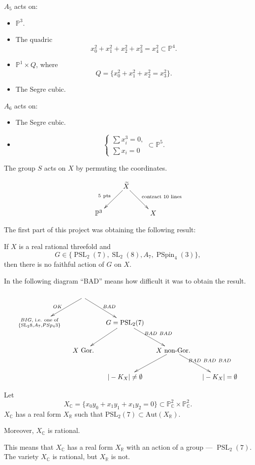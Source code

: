\medskip\noindent
$A_5$ acts on:
\begin{itemize}
\item $\mathbb{P}^3$.
\item The quadric
$$
x_0^2+x_1^2+x_2^2+x_3^2=x_4^2
\subset \mathbb{P}^4.
$$
\item $\mathbb{P}^1\times Q$,
where
$$
Q=
\{x_0^2+x_1^2+x_2^2=x_3^2\}.
$$
\item The Segre cubic.
\end{itemize}

\medskip\noindent
$A_6$ acts on:
\begin{itemize}
\item The Segre cubic.
\item
$$
\begin{cases}
\sum x_i^3=0,\\
\sum x_i=0
\end{cases}
\subset \mathbb{P}^5.
$$
\end{itemize}

The group $S$ acts on $X$ by
permuting the coordinates.

$$
\xymatrix{
&& \widetilde{X}
\ar[dl]_{5\ \text{pts}}
\ar[dr]^{\text{contract $10$ lines}}\\
& \mathbb{P}^3 && X
}
$$

\medskip\noindent
The first part of this project
was obtaining the following result:

\begin{proposition}
\label{proposition-x-real}
If $X$ is a real rational
threefold and
$$
G\in
\{
\operatorname{PSL}_2(7),
\operatorname{SL}_2(8),
A_7,
\operatorname{PSpin}_4(3)
\},
$$
then there is no faithful action of
$G$ on $X$.
\end{proposition}

\noindent
In the following diagram ``BAD''
means how difficult it was to obtain
the result.

$$
\xymatrix@C=1.2em@R=2.5em{
&& \leavevmode
\ar[dl]_{OK}
\ar[dr]^{BAD}
&&
\\
& \substack{BIG\text{, i.e. one of}\\
\{\text{SL}_28, A_7,PSp_43\}}
&&
G=\operatorname{PSL}_2(7)
\ar[dl]
\ar[dr]^{BAD\ BAD}
&
\\
&& X\ \text{Gor.}
&&
X\ \text{non-Gor.}
\ar[dl]
\ar[dr]^{BAD\ BAD\ BAD}
&
\\
&&& |-K_X|\neq\emptyset
&&
|-K_X|=\emptyset
&
}
$$

\begin{remark}
\label{remark-terpenan-simmerman}
Let
$$
X_{\mathbb{C}}=
\{x_0y_0+x_1y_1+x_1y_2=0\}
\subset
\mathbb{P}^2_{\mathbb{C}}
\times
\mathbb{P}^2_{\mathbb{C}}.
$$
$X_\mathbb{C}$ has a real form $X_\mathbb{R}$
such that $\text{PSL}_2(7) \subset
\text{Aut}(X_\mathbb{R})$.

Moreover, $X_\mathbb{C}$ is rational.

This means that $
X_\mathbb{C}$ has a real form 
$X_\mathbb{R}$ with an
action of a group ---
$\operatorname{PSL}_2(7)$.
The variety $X_\mathbb{C}$ is rational, but
$X_\mathbb{R}$ is not.
\end{remark}


